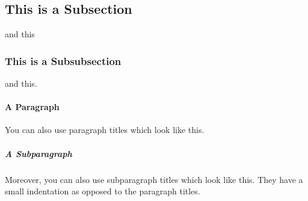 \subsection{This is a Subsection}
and this
\subsubsection{This is a Subsubsection}
and this.

\paragraph{A Paragraph}
You can also use paragraph titles which look like this.

\subparagraph{A Subparagraph} Moreover, you can also use subparagraph titles which look like this. They have a small indentation as opposed to the paragraph titles.

